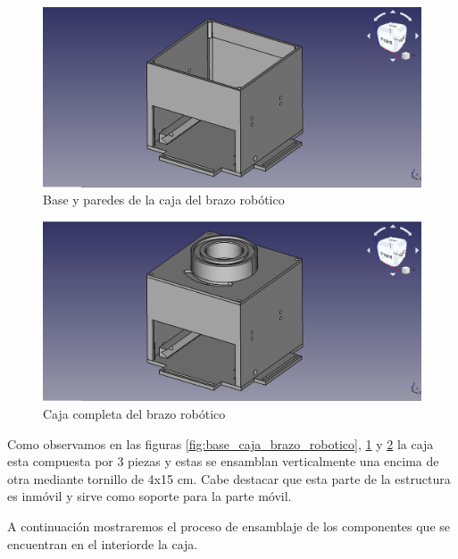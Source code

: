 \begin{figure}[H]
    \centering 
    \includegraphics[width=1\linewidth]{pictures/BaseYParedes.png}
    \caption{Base y paredes de la caja del brazo robótico}
    \label{fig:base_paredes_caja_brazo_robotico}
\end{figure}

\begin{figure}[H]
    \centering 
    \includegraphics[width=1\linewidth]{pictures/CajaCompleta.png}
    \caption{Caja completa del brazo robótico}
    \label{fig:caja_completa_brazo_robotico}
\end{figure}

Como observamos en las figuras \ref{fig:base_caja_brazo_robotico}, \ref{fig:base_paredes_caja_brazo_robotico} y \ref{fig:caja_completa_brazo_robotico} la caja esta compuesta por 3 piezas y estas se ensamblan verticalmente una encima de otra mediante tornillo de 4x15 cm.
Cabe destacar que esta parte de la estructura es inmóvil y sirve como soporte para la parte móvil.

A continuación mostraremos el proceso de ensamblaje de los componentes que se encuentran en el interiorde la caja.

